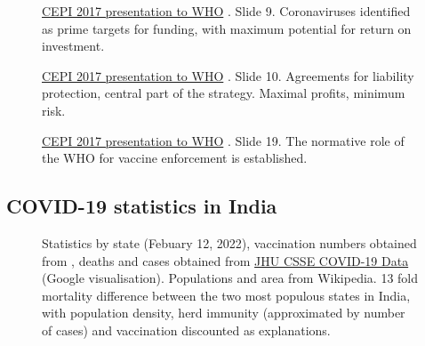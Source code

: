 \documentclass[11pt,a4paper,notitlepage]{report}
\begin{document}
\begin{figure}[h]
    \centering
    \caption{\href{https://www.who.int/medicines/ebola-treatment/TheCoalitionEpidemicPreparednessInnovations-an-overview.pdf}{CEPI 2017 presentation to WHO} \cite{cepi072017}. Slide 9. Coronaviruses identified as prime targets for funding, with maximum potential for return on investment.}
    \label{fig:CEPI-slide-9}
\end{figure}

\begin{figure}[h]
    \centering
    \caption{\href{https://www.who.int/medicines/ebola-treatment/TheCoalitionEpidemicPreparednessInnovations-an-overview.pdf}{CEPI 2017 presentation to WHO} \cite{cepi072017}. Slide 10. Agreements for liability protection, central part of the strategy. Maximal profits, minimum risk.}
    \label{fig:CEPI-slide-10}
\end{figure}

\begin{figure}[h]
    \centering
    \caption{\href{https://www.who.int/medicines/ebola-treatment/TheCoalitionEpidemicPreparednessInnovations-an-overview.pdf}{CEPI 2017 presentation to WHO} \cite{cepi072017}. Slide 19. The normative role of the WHO for vaccine enforcement is established.}
    \label{fig:CEPI-slide-19}
\end{figure}

\clearpage

\subsection*{COVID-19 statistics in India}


\begin{figure}[h]
    \centering
    \caption{Statistics by state (Febuary 12, 2022), vaccination numbers obtained from \cite{statistaIndiaVaccination}, deaths and cases obtained from \href{https://github.com/CSSEGISandData/COVID-19}{JHU CSSE COVID-19 Data} (Google visualisation). Populations and area from Wikipedia. 13 fold mortality difference between the two most populous states in India, with population density, herd immunity (approximated by number of cases) and vaccination discounted as explanations.}
    \label{fig:india-stats}
\end{figure}
\end{document}
